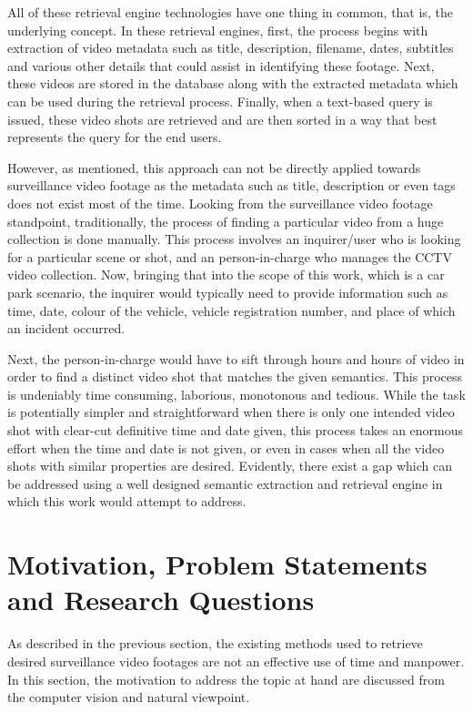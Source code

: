All of these retrieval engine technologies have one thing in common, that is, the underlying concept. In these retrieval engines, first, the process begins with extraction of video metadata such as title, description, filename, dates, subtitles and various other details that could assist in identifying these footage. Next, these videos are stored in the database along with the extracted metadata which can be used during the retrieval process. Finally, when a text-based query is issued, these video shots are retrieved and are then sorted in a way that best represents the query for the end users. 

However, as mentioned, this approach can not be directly applied towards surveillance video footage as the metadata such as title, description or even tags does not exist most of the time. Looking from the surveillance video footage standpoint, traditionally, the process of finding a particular video from a huge collection is done manually. This process involves an inquirer/user who is looking for a particular scene or shot, and an person-in-charge who manages the CCTV video collection. Now, bringing that into the scope of this work, which is a car park scenario, the inquirer would typically need to provide information such as time, date, colour of the vehicle, vehicle registration number, and place of which an incident occurred. %

Next, the person-in-charge would have to sift through hours and hours of video in order to find a distinct video shot that matches the given semantics. This process is undeniably time consuming, laborious, monotonous and tedious. While the task is potentially simpler and straightforward when there is only one intended video shot with clear-cut definitive time and date given, this process takes an enormous effort when the time and date is not given, or even in cases when all the video shots with similar properties are desired. Evidently, there exist a gap which can be addressed using a well designed semantic extraction and retrieval engine in which this work would attempt to address.

\section{Motivation, Problem Statements and Research Questions}

As described in the previous section, the existing methods used to retrieve desired surveillance video footages are not an effective use of time and manpower. In this section, the motivation to address the topic at hand are discussed from the computer vision and natural viewpoint.

